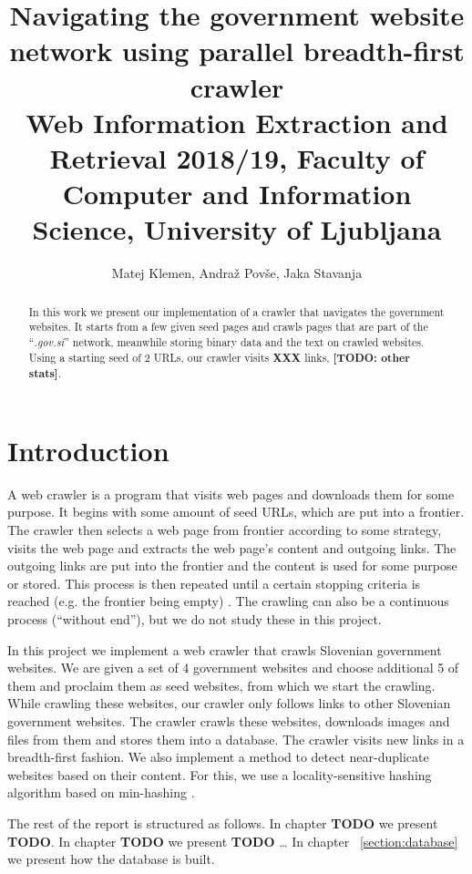 \documentclass[9pt]{IEEEtran}
\title{\vspace{0ex} %
Navigating the government website network using parallel breadth-first crawler
\\ \normalsize{Web Information Extraction and Retrieval 2018/19, Faculty of Computer and Information Science, University of Ljubljana}}
\author{ %
Matej Klemen, Andraž Povše, Jaka Stavanja
\vspace{-4.0ex}
}
\begin{document}
\maketitle

\begin{abstract}
In this work we present our implementation of a crawler that navigates the government websites.
It starts from a few given seed pages and crawls pages that are part of the ``\textit{.gov.si}'' network, meanwhile storing binary data and the text on crawled websites.
Using a starting seed of 2 URLs, our crawler visits \textbf{XXX} links, \textbf{[TODO: other stats]}.
\end{abstract}

\section{Introduction}

A web crawler is a program that visits web pages and downloads them for some purpose.
It begins with some amount of seed URLs, which are put into a frontier.
The crawler then selects a web page from frontier according to some strategy, visits the web page and extracts the web page's content and outgoing links.
The outgoing links are put into the frontier and the content is used for some purpose or stored.
This process is then repeated until a certain stopping criteria is reached (e.g. the frontier being empty) \cite{Manning2008}.
The crawling can also be a continuous process (``without end''), but we do not study these in this project. 

In this project we implement a web crawler that crawls Slovenian government websites. 
We are given a set of 4 government websites and choose additional 5 of them and proclaim them as seed websites, from which we start the crawling.
While crawling these websites, our crawler only follows links to other Slovenian government websites.
The crawler crawls these websites, downloads images and files from them and stores them into a database. 
The crawler visits new links in a breadth-first fashion.
We also implement a method to detect near-duplicate websites based on their content.
For this, we use a locality-sensitive hashing algorithm based on min-hashing \cite{Gionis1999}.

The rest of the report is structured as follows.
In chapter \textbf{TODO} we present \textbf{TODO}.
In chapter \textbf{TODO} we present \textbf{TODO} \ldots
In chapter ~\ref{section:database} we present how the database is built.
\end{document}
